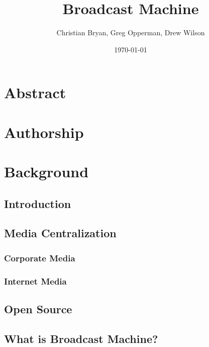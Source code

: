 \documentclass[a4paper,12pt]{report}
\author{Christian Bryan, Greg Opperman, Drew Wilson}
\date{\today}
\title{Broadcast Machine}
\begin{document}
\maketitle

\chapter*{Abstract}

\chapter*{Authorship}

\tableofcontents

\chapter{Background}

\section{Introduction}

\section{Media Centralization}

\subsection*{Corporate Media}

\subsection*{Internet Media}

\section{Open Source}

\section{What is Broadcast Machine?}
\end{document}
